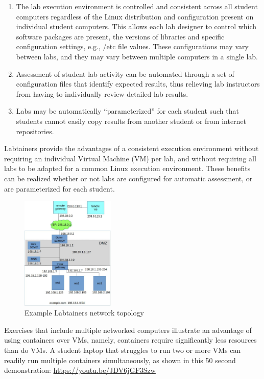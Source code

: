 \documentclass[12pt]{article}
\begin{document}
\begin{enumerate}
\item The lab execution environment is controlled and consistent
across all student computers regardless of the Linux distribution
and configuration present on individual student computers.  
This allows each lab designer to control
which software packages are present, the versions of libraries and
specific configuration settings, e.g., /etc file values. These configurations
may vary between labs, and they may vary between multiple computers in
a single lab.

\item Assessment of student lab activity can be automated through a
set of configuration files that identify expected results, thus
relieving lab instructors from having to individually review detailed lab
results.

\item Labs may be automatically ``parameterized'' for each student such that
students cannot easily copy results from another student or from internet
repositories.  
\end{enumerate}

Labtainers provide the advantages of a consistent
execution environment without requiring
an individual Virtual Machine (VM) per lab, and without requiring all labs to be adapted for
a common Linux execution environment.   These benefits can be realized 
whether or not labs are configured for automatic assessment, 
or are parameterized for each student.

\begin{figure}[ht]
\centering
\includegraphics[width=0.4\textwidth,natwidth=621,natheight=403]{dmz-lab.jpg}
\caption{Example Labtainers network topology}
\label{fig:dmz}
\end{figure}

Exercises that include multiple networked computers illustrate an advantage 
of using containers over VMs, namely, containers require significantly less resources
than do VMs.  A student laptop that struggles to run two or more VMs can readily 
run multiple containers simultaneously, as shown in this 50 second demonstration: \url{https://youtu.be/JDV6jGF3Szw} 
\end{document}
